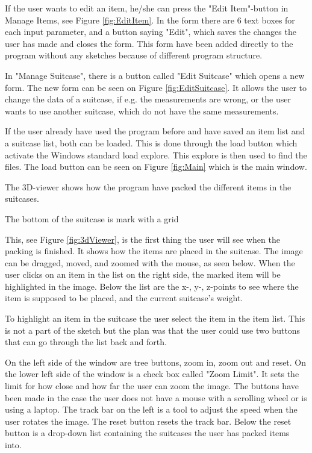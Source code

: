 If the user wants to edit an item, he/she can press the "Edit Item"-button in Manage Items, see Figure \ref{fig:EditItem}. In the form there are 6 text boxes for each input parameter, and a button saying "Edit", which saves the changes the user has made and closes the form. This form have been added directly to the program without any sketches because of different program structure.

In "Manage Suitcase", there is a button called "Edit Suitcase" which opens a new form. The new form can be seen on Figure \ref{fig:EditSuitcase}. It allows the user to change the data of a suitcase, if e.g. the measurements are wrong, or the user wants to use another suitcase, which do not have the same measurements.

If the user already have used the program before and have saved an item list and a suitcase list, both can be loaded. This is done through the load button which activate the Windows standard load explore. This explore is then used to find the files. The load button can be seen on Figure \ref{fig:Main} which is the main window.

The 3D-viewer shows how the program have packed the different items in the suitcases.

The bottom of the suitcase is mark with a grid

This, see Figure \ref{fig:3dViewer}, is the first thing the user will see when the packing is finished. It shows how the items are placed in the suitcase.
The image can be dragged, moved, and zoomed with the mouse, as seen below. When the user clicks on an item in the list on the right side, the marked item will be highlighted in the image. Below the list are the x-, y-, z-points to see where the item is supposed to be placed, and the current suitcase's weight.

To highlight an item in the suitcase the user select the item in the item list. This is not a part of the sketch but the plan was that the user could use two buttons that can go through the list back and forth.

On the left side of the window are tree buttons, zoom in, zoom out and reset. On the lower left side of the window is a check box called "Zoom Limit". It sets the limit for how close and how far the user can zoom the image. The buttons have been made in the case the user does not have a mouse with a scrolling wheel or is using a laptop. The track bar on the left is a tool to adjust the speed when the user rotates the image. The reset button resets the track bar. Below the reset button is a drop-down list containing the suitcases the user has packed items into.

